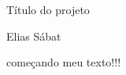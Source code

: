 \documentclass[a4paper, 12pt]{article}
\begin{document}
\begin{center}
\huge{Título do projeto}
\end{center}

\begin{center}
Elias Sábat
\end{center}
 
começando meu texto!!!
\end{document}
